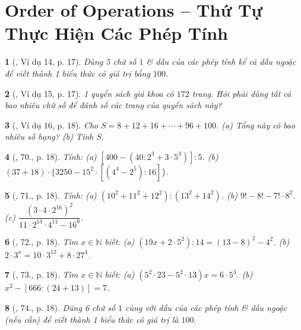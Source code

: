 \documentclass{article}
\newtheorem{baitoan}{}
\begin{document}
\section{Order of Operations -- Thứ Tự Thực Hiện Các Phép Tính}

\begin{baitoan}[\cite{Tuyen_Toan_6}, Ví dụ 14, p. 17]
	Dùng 5 chữ số $1$ \& dấu của các phép tính kể cả dấu ngoặc để viết thành 1 biểu thức có giá trị bằng $100$.
\end{baitoan}

\begin{baitoan}[\cite{Tuyen_Toan_6}, Ví dụ 15, p. 17]
	1 quyển sách giá khoa có $172$ trang. Hỏi phải dùng tất cả bao nhiêu chữ số để đánh số các trang của quyển sách này?
\end{baitoan}

\begin{baitoan}[\cite{Tuyen_Toan_6}, Ví dụ 16, p. 18]
	Cho $S = 8 + 12 + 16 + \cdots + 96 +100$. (a) Tổng này có bao nhiêu số hạng? (b) Tính $S$.
\end{baitoan}

\begin{baitoan}[\cite{Tuyen_Toan_6}, 70., p. 18]
	Tính: (a) $[400 - (40:2^3 + 3\cdot5^3)]:5$. (b) $(37 + 18)\cdot\{3250 - 15^2\cdot[(4^4 - 2^5):16]\}$.
\end{baitoan}

\begin{baitoan}[\cite{Tuyen_Toan_6}, 71., p. 18]
	Tính: (a) $(10^2 + 11^2 + 12^2):(13^2 + 14^2)$. (b) $9! - 8! - 7!\cdot8^2$. (c) $\dfrac{(3\cdot4\cdot2^{16})^2}{11\cdot2^{13}\cdot4^{11} - 16^9}$.
\end{baitoan}

\begin{baitoan}[\cite{Tuyen_Toan_6}, 72., p. 18]
	Tìm $x\in\mathbb{N}$ biết: (a) $(19x + 2\cdot5^2):14 = (13 - 8)^2 - 4^2$. (b) $2\cdot3^x = 10\cdot3^{12} + 8\cdot27^4$. 
\end{baitoan}

\begin{baitoan}[\cite{Tuyen_Toan_6}, 73., p. 18]
	Tìm $x\in\mathbb{N}$ biết: (a) $(5^2\cdot23 - 5^2\cdot13)x = 6\cdot5^3$. (b) $x^2 - [666:(24 + 13)] = 7$.
\end{baitoan}

\begin{baitoan}[\cite{Tuyen_Toan_6}, 74., p. 18]
	Dùng 6 chữ số $1$ cùng với dấu của các phép tính \& dấu ngoặc (nếu cần) để viết thành 1 biểu thức có giá trị là $100$.
\end{baitoan}
\end{document}
